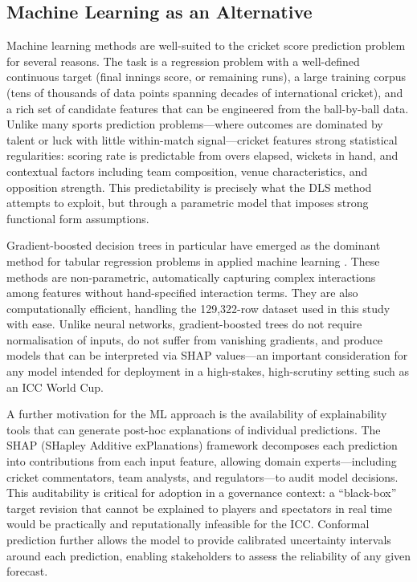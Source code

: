 \documentclass[10pt,a4paper,twocolumn]{article}
\begin{document}
\subsection{Machine Learning as an Alternative}

Machine learning methods are well-suited to the cricket score prediction problem for several reasons. The task is a regression problem with a well-defined continuous target (final innings score, or remaining runs), a large training corpus (tens of thousands of data points spanning decades of international cricket), and a rich set of candidate features that can be engineered from the ball-by-ball data. Unlike many sports prediction problems---where outcomes are dominated by talent or luck with little within-match signal---cricket features strong statistical regularities: scoring rate is predictable from overs elapsed, wickets in hand, and contextual factors including team composition, venue characteristics, and opposition strength. This predictability is precisely what the DLS method attempts to exploit, but through a parametric model that imposes strong functional form assumptions.

Gradient-boosted decision trees in particular have emerged as the dominant method for tabular regression problems in applied machine learning \citep{Chen2016, Ke2017, Prokhorenkova2018}. These methods are non-parametric, automatically capturing complex interactions among features without hand-specified interaction terms. They are also computationally efficient, handling the 129,322-row dataset used in this study with ease. Unlike neural networks, gradient-boosted trees do not require normalisation of inputs, do not suffer from vanishing gradients, and produce models that can be interpreted via SHAP \citep{Lundberg2017} values---an important consideration for any model intended for deployment in a high-stakes, high-scrutiny setting such as an ICC World Cup.

A further motivation for the ML approach is the availability of explainability tools that can generate post-hoc explanations of individual predictions. The SHAP (SHapley Additive exPlanations) framework \citep{Lundberg2017, Lundberg2020} decomposes each prediction into contributions from each input feature, allowing domain experts---including cricket commentators, team analysts, and regulators---to audit model decisions. This auditability is critical for adoption in a governance context: a ``black-box'' target revision that cannot be explained to players and spectators in real time would be practically and reputationally infeasible for the ICC. Conformal prediction \citep{Vovk2005} further allows the model to provide calibrated uncertainty intervals around each prediction, enabling stakeholders to assess the reliability of any given forecast.
\end{document}
